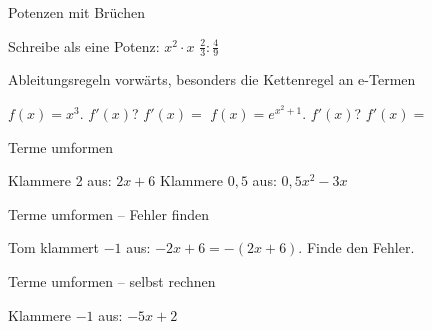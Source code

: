\setcounter{aufgabe}{0}

\begin{aufgabe}{Potenzen mit Brüchen}
\begin{teile}
\teil Schreibe als eine Potenz: $x^2 \cdot x$ \leerfeld
\teil $\frac{2}{3} : \frac{4}{9}$ \leerfeld
\end{teile}
\end{aufgabe}

\begin{aufgabe}{Ableitungsregeln vorwärts, besonders die Kettenregel an e-Termen}
\begin{teile}
\teil $f(x) = x^3$. $f'(x)$? $f'(x) = $ \leerfeld
\teil $f(x) = e^{x^2 + 1}$. $f'(x)$? $f'(x) = $ \leerfeld
\end{teile}
\end{aufgabe}

\begin{aufgabe}{Terme umformen}
\begin{teile}
\teil Klammere 2 aus: $2x + 6$ \leerfeld
\teil Klammere $0{,}5$ aus: $0{,}5x^2 - 3x$ \leerfeld
\end{teile}
\end{aufgabe}

\begin{aufgabe}{Terme umformen – Fehler finden}
\begin{teile}
\teil Tom klammert $-1$ aus: $-2x + 6 = -(2x + 6)$. Finde den Fehler.
\end{teile}
\end{aufgabe}

\begin{aufgabe}{Terme umformen – selbst rechnen}
\begin{teile}
\teil Klammere $-1$ aus: $-5x + 2$ \leerfeld
\end{teile}
\end{aufgabe}
